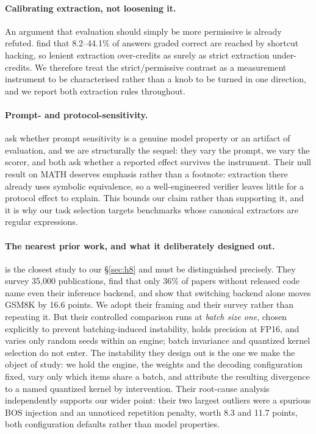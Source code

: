 \documentclass[11pt]{article}
\begin{document}
\paragraph{Calibrating extraction, not loosening it.}
An argument that evaluation should simply be more permissive is already
refuted. \citet{ren2026shortcut} find that 8.2--44.1\% of answers graded correct
are reached by shortcut hacking, so lenient extraction over-credits as surely as
strict extraction under-credits. We therefore treat the strict/permissive
contrast as a measurement instrument to be characterised rather than a knob to
be turned in one direction, and we report both extraction rules throughout.

\paragraph{Prompt- and protocol-sensitivity.}
\citet{hua2025flaw} ask whether prompt sensitivity is a genuine model property
or an artifact of evaluation, and we are structurally the sequel: they vary the
prompt, we vary the scorer, and both ask whether a reported effect survives the
instrument. Their null result on MATH deserves emphasis rather than a footnote:
extraction there already uses symbolic equivalence, so a well-engineered
verifier leaves little for a protocol effect to explain. This bounds our claim
rather than supporting it, and it is why our task selection targets benchmarks
whose canonical extractors are regular expressions.
\paragraph{The nearest prior work, and what it deliberately designed out.}
\citet{pape2026silent} is the closest study to our \S\ref{sec:h8} and must be
distinguished precisely. They survey 35{,}000 publications, find that only 36\% of
papers without released code name even their inference backend, and show that
switching backend alone moves GSM8K by 16.6 points. We adopt their framing and
their survey rather than repeating it. But their controlled comparison runs at
\emph{batch size one}, chosen explicitly to prevent batching-induced instability,
holds precision at FP16, and varies only random seeds within an engine; batch
invariance and quantized kernel selection do not enter. The instability they
design out is the one we make the object of study: we hold the engine, the
weights and the decoding configuration fixed, vary only which items share a
batch, and attribute the resulting divergence to a named quantized kernel by
intervention. Their root-cause analysis independently supports our wider point:
their two largest outliers were a spurious BOS injection and an unnoticed
repetition penalty, worth 8.3 and 11.7 points, both configuration defaults rather
than model properties.
\end{document}

